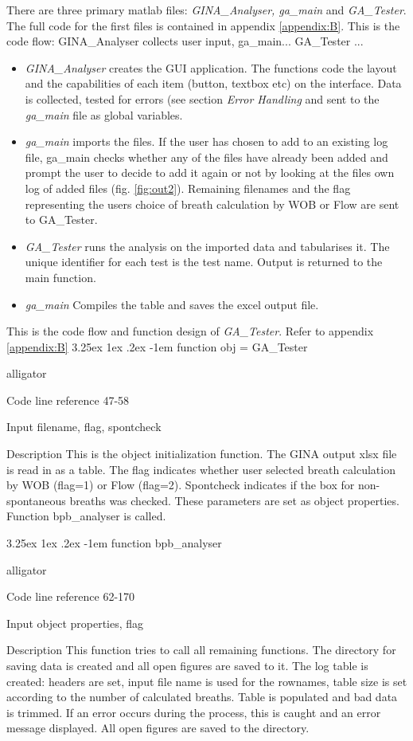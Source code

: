 \documentclass[12pt, openany, oneside]{book}
\makeatletter
\renewcommand\subparagraph{\@startsection{subparagraph}{6}{\parindent}%
  {3.25ex \@plus1ex \@minus .2ex}%
  {-1em}%
  {\normalfont\normalsize\bfseries}}
\makeatother
\begin{document}
There are three primary matlab files: \textit{GINA\_Analyser, ga\_main} and \textit{GA\_Tester}. The full code for the first files is contained in appendix \ref{appendix:B}.
This is the code flow: GINA\_Analyser collects user input, ga\_main... GA\_Tester ... 
\begin{itemize}
	\item \textit{GINA\_Analyser} creates the GUI application. The functions code the layout and the capabilities of each item (button, textbox etc) on the interface. 
Data is collected, tested for errors (see section \textit{Error Handling} and sent to the \textit{ga\_main} file as global variables. 
	\item \textit{ga\_main} imports the files. If the user has chosen to add to an existing log file, ga\_main checks whether any of the files have already been added and prompt the user to decide to add it again or not by looking at the files own log of added files (fig. \ref{fig:out2}). Remaining filenames and the flag representing the users choice of breath calculation by WOB or Flow are sent to GA\_Tester.
	\item	\textit{GA\_Tester} runs the analysis on the imported data and tabularises it. The unique identifier for each test is the test name. Output is returned to the main function.
\item \textit{ga\_main} Compiles the table and saves the excel output file. 
\end{itemize}



This is the code flow and function design of \textit{GA\_Tester}. Refer to appendix \ref{appendix:B}
\subparagraph{function obj = GA\_Tester}
\begin{labeling}{alligator}
\item[Code line reference] 47-58
\item[Input] filename, flag, spontcheck
\item[Description] This is the object initialization function. The GINA output xlsx file is read in as a table. The flag indicates whether user selected breath calculation by WOB (flag=1) or Flow (flag=2). Spontcheck indicates if the box for non-spontaneous breaths was checked. These parameters are set as object properties. Function bpb\_analyser is called.
\end{labeling}

\subparagraph{function bpb\_analyser}
\begin{labeling}{alligator}
\item[Code line reference] 62-170
\item[Input] object properties, flag
\item[Description] This function tries to call all remaining functions. The directory for saving data is created and all open figures are saved to it. The log table is created: headers are set, input file name is used for the rownames, table size is set according to the number of calculated breaths. Table is populated and bad data is trimmed. If an error occurs during the process, this is caught and an error message displayed. All open figures are saved to the directory.
\end{labeling}
\end{document}
